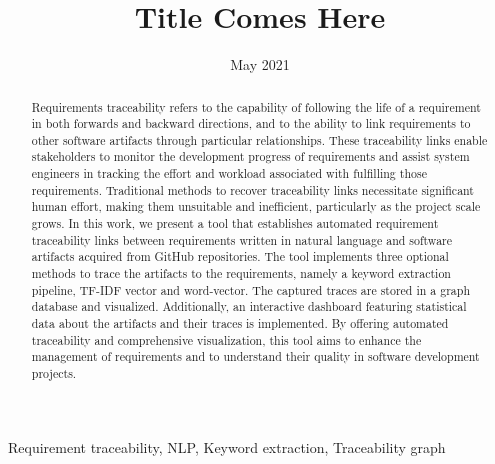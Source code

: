 \documentclass[conference]{IEEEtran}
\begin{document}
\title{Title Comes Here }
\author{
}

\date{May 2021}

\maketitle
\begin{abstract}
    Requirements traceability refers to the capability of following the life of a requirement in both forwards and backward directions, and to the ability to link requirements to other software artifacts through particular relationships. These traceability links enable stakeholders to monitor the development progress of requirements and assist system engineers in tracking the effort and workload associated with fulfilling those requirements. Traditional methods to recover traceability links necessitate significant human effort, making them unsuitable and inefficient, particularly as the project scale grows. In this work, we present a tool that establishes automated requirement traceability links between requirements written in natural language and software artifacts acquired from GitHub repositories. The tool implements three optional methods to trace the artifacts to the requirements, namely a keyword extraction pipeline, TF-IDF vector and word-vector. The captured traces are stored in a graph database and visualized. Additionally, an interactive dashboard featuring statistical data about the artifacts and their traces is implemented. By offering automated traceability and comprehensive visualization, this tool aims to enhance the management of requirements and to understand their quality in software development projects.
\end{abstract}
\begin{IEEEkeywords}
Requirement traceability, NLP, Keyword extraction, Traceability graph
\end{IEEEkeywords}
\end{document}
